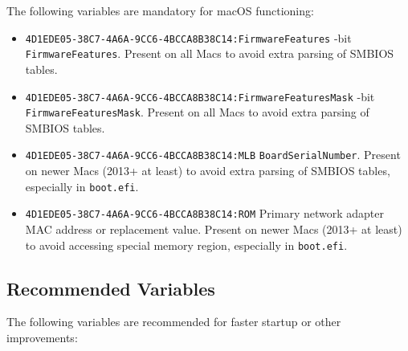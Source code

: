 \documentclass[]{article}
\makeatletter
\providecommand{\tightlist}{%
  \setlength{\itemsep}{0pt}\setlength{\parskip}{0pt}}
\renewcommand{\label}[1]{%
\zref@wrapper@immediate{\oldlabel{#1}}}  %
\makeatother
\begin{document}
The following variables are mandatory for macOS functioning:

\begin{itemize}
\tightlist
\item
  \texttt{4D1EDE05-38C7-4A6A-9CC6-4BCCA8B38C14:FirmwareFeatures}
  -bit \texttt{FirmwareFeatures}. Present on all Macs to avoid extra parsing of SMBIOS tables.
\item
  \texttt{4D1EDE05-38C7-4A6A-9CC6-4BCCA8B38C14:FirmwareFeaturesMask}
  -bit \texttt{FirmwareFeaturesMask}. Present on all Macs to avoid extra parsing
  of SMBIOS tables.
\item
  \texttt{4D1EDE05-38C7-4A6A-9CC6-4BCCA8B38C14:MLB}
  \break
  \texttt{BoardSerialNumber}. Present on newer Macs (2013+ at least) to avoid extra parsing
  of SMBIOS tables, especially in \texttt{boot.efi}.
\item
  \texttt{4D1EDE05-38C7-4A6A-9CC6-4BCCA8B38C14:ROM}
  \break
  Primary network adapter MAC address or replacement value. Present on newer Macs
  (2013+ at least) to avoid accessing special memory region, especially in \texttt{boot.efi}.
\end{itemize}

\subsection{Recommended Variables}\label{nvramvarsrec}

The following variables are recommended for faster startup or other
improvements:
\end{document}
